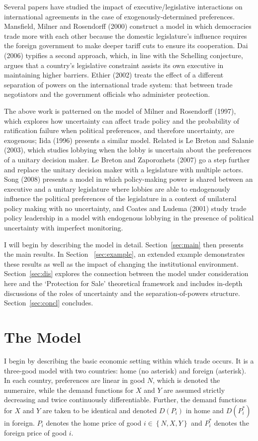 \documentclass[10pt]{article}
\begin{document}
Several papers have studied the impact of executive/legislative interactions on international agreements in the case of exogenously-determined preferences. Mansfield, Milner and Rosendorff (2000) construct a model in which democracies trade more with each other because the domestic legislature's influence requires the foreign government to make deeper tariff cuts to ensure its cooperation. Dai (2006) typifies a second approach, which, in line with the Schelling conjecture, argues that a country's legislative constraint assists its own executive in maintaining higher barriers. Ethier (2002) treats the effect of a different separation of powers on the international trade system: that between trade negotiators and the government officials who administer protection.

The above work is patterned on the model of Milner and Rosendorff (1997), which explores how uncertainty can affect trade policy and the probability of ratification failure when political preferences, and therefore uncertainty, are exogenous;  Iida (1996) presents a similar model. Related is Le Breton and Salanie (2003), which studies lobbying when the lobby is uncertain about the preferences of a unitary decision maker. Le Breton and Zaporozhets (2007) go a step further and replace the unitary decision maker with a legislature with multiple actors. Song (2008) presents a model in which policy-making power is shared between an executive and a unitary legislature where lobbies are able to endogenously influence the political preferences of the legislature in a context of unilateral policy making with no uncertainty, and Coates and Ludema (2001) study trade policy leadership in a model with endogenous lobbying in the presence of political uncertainty with imperfect monitoring.

I will begin by describing the model in detail. Section~\ref{sec:main} then presents the main results. In Section~ \ref{sec:example}, an extended example demonstrates these results as well as the impact of changing the institutional environment. Section~\ref{sec:dis} explores the connection between the model under consideration here and the `Protection for Sale' theoretical framework and includes in-depth discussions of the roles of uncertainty and the separation-of-powers structure. Section~\ref{sec:concl} concludes.


\section{The Model}
\label{sec:model}
I begin by describing the basic economic setting within which trade occurs. It is a three-good model with two countries: home (no asterisk) and foreign (asterisk). In each country, preferences are linear in good $N$, which is denoted the numeraire, while the demand functions for $X$ and $Y$ are assumed strictly decreasing and twice continuously differentiable. Further, the demand functions for $X$ and $Y$ are taken to be identical and denoted $D(P_i)$ in home and $D(P_i^*)$ in foreign. $P_i$ denotes the home price of good $i \in \left\{N,X,Y\right\}$ and $P_i^*$ denotes the foreign price of good $i$.
\end{document}
